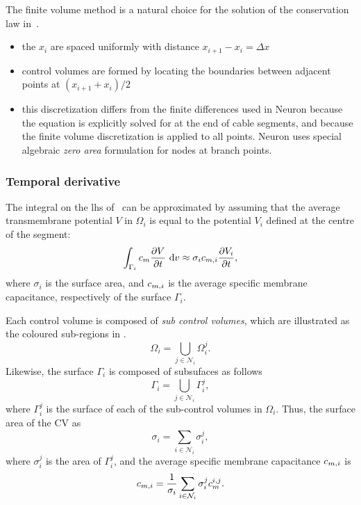 The finite volume method is a natural choice for the solution of the conservation law in~.

\begin{itemize}
    \item   the $x_i$ are spaced uniformly with distance $x_{i+1}-x_{i} = \Delta x$
    \item   control volumes are formed by locating the boundaries between adjacent points at $(x_{i+1}+x_{i})/2$
    \item   this discretization differs from the finite differences used in Neuron because the equation is explicitly solved for at the end of cable segments, and because the finite volume discretization is applied to all points. Neuron uses special algebraic \emph{zero area} formulation for nodes at branch points.
\end{itemize}

\subsubsection{Temporal derivative}
The integral on the lhs of~ can be approximated by assuming that the average transmembrane potential $V$ in $\Omega_i$ is equal to the potential $V_i$ defined at the centre of the segment:
\begin{equation}
    \int_{\Gamma_i}{c_m \frac{\partial{V}}{\partial{t}} } ~\text{d}{v} \approx \sigma_i c_{m,i} \frac{\partial{V_i}}{\partial{t}},
    \label{eq:dvdt}
\end{equation}
where $\sigma_i$ is the surface area, and $c_{m,i}$ is the average specific membrane capacitance, respectively of the surface $\Gamma_i$.

Each control volume is composed of \emph{sub control volumes}, which are illustrated as the coloured sub-regions in .
\begin{equation*}
    \Omega_i = \bigcup_{j\in\mathcal{N}_i}{\Omega_i^j}.
\end{equation*}
Likewise, the surface $\Gamma_i$ is composed of subsufaces as follows
\begin{equation*}
    \Gamma_i = \bigcup_{j\in\mathcal{N}_i}{\Gamma_i^j},
\end{equation*}
where $\Gamma_i^j$ is the surface of each of the sub-control volumes in $\Omega_i$.
Thus, the surface area of the CV as
\begin{equation*}
    \sigma_i = \sum_{i\in\mathcal{N}_i}{\sigma_i^j},
\end{equation*}
where $\sigma_i^j$ is the area of $\Gamma_i^j$, and the average specific membrane capacitance $c_{m,i}$ is
\begin{equation*}
    c_{m,i} = \frac{1}{\sigma_i}\sum_{i\in\mathcal{N}_i}{\sigma_i^j c_m^{i,j}}.
\end{equation*}

